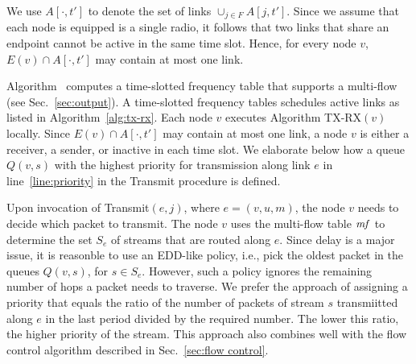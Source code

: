 \documentclass[12pt]{article}
\newenvironment{proof sketch}[1]{\noindent {\emph{Proof sketch of #1:}}}{\hfill \qed}
\newcommand{\Alg}{\text{\sc{alg-name}}}
\newcommand{\mf}{\text{\emph{mf}}}
\begin{document}
We use $A[\cdot,t']$ to denote the set of links $\cup_{j\in F}
A[j,t']$.  Since we assume that each node is equipped is a single
radio, it follows that two links that share an endpoint cannot be
active in the same time slot.  Hence, for every node $v$, $E(v) \cap
A[\cdot ,t']$ may contain at most one link.

Algorithm \Alg\ computes a time-slotted frequency table that supports
a multi-flow (see Sec.~\ref{sec:output}). A time-slotted frequency
tables schedules active links as listed in Algorithm~\ref{alg:tx-rx}.
Each node $v$ executes Algorithm TX-RX$(v)$ locally.  Since $E(v) \cap
A[\cdot ,t']$ may contain at most one link, a node $v$ is either a
receiver, a sender, or inactive in each time slot.  We elaborate below how
a queue $Q(v,s)$ with the highest priority for transmission along link
$e$ in line~\ref{line:priority} in the Transmit procedure is defined.

Upon invocation of Transmit$(e,j)$, where $e=(v,u,m)$, the node $v$
needs to decide which packet to transmit. The node $v$ uses the
multi-flow table $\mf$ to determine the set $S_e$ of streams that are
routed along $e$.  Since delay is a major issue, it is reasonble to
use an EDD-like policy, i.e., pick the oldest packet in the queues
$Q(v,s)$, for $s\in S_e$.  However, such a policy ignores the
remaining number of hops a packet needs to traverse. We prefer the
approach of assigning a priority that equals the ratio of the number
of packets of stream $s$ transmiitted along $e$ in the last period
divided by the required number. The lower this ratio, the higher
priority of the stream. This approach also combines well with the flow
control algorithm described in Sec.~\ref{sec:flow control}.
\end{document}
